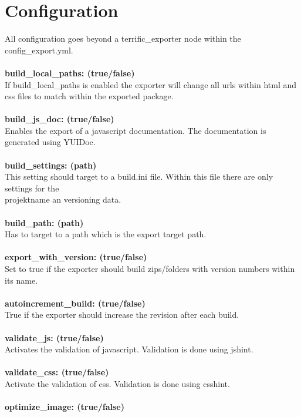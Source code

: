 \section{Configuration}

All configuration goes beyond a terrific\_exporter node within the config\_export.yml.\\
\\
\textbf{build\_local\_paths: (true/false)}\\
\indent If build\_local\_paths is enabled the exporter will change all urls within html and css files to match within the exported package.\\
\\
\textbf{build\_js\_doc: (true/false)} \\
\indent Enables the export of a javascript documentation. The documentation is generated using YUIDoc. \\
\\
\textbf{build\_settings: (path)}\\
\indent This setting should target to a build.ini file. Within this file there are only settings for the \\projektname an versioning data.\\
\\
\textbf{build\_path: (path)}\\
\indent Has to target to a path which is the export target path.\\
\\
\textbf{export\_with\_version: (true/false)}\\
\indent Set to true if the exporter should build zips/folders with version numbers within its name.\\
\\
\textbf{autoincrement\_build: (true/false)}\\
\indent True if the exporter should increase the revision after each build.\\
\\
\textbf{validate\_js: (true/false)}\\
\indent Activates the validation of javascript. Validation is done using jshint.\\
\\
\textbf{validate\_css: (true/false)}\\
\indent Activate the validation of css. Validation is done using csshint.\\
\\
\textbf{optimize\_image: (true/false)}\\

